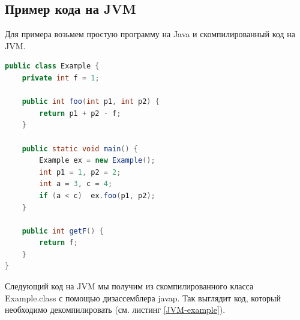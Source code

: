\subsection{Пример кода на JVM}
Для примера возьмем простую программу на Java и скомпилированный код на JVM.

\begin{lstlisting}[label=Java-example,caption=Простой Java-класс, frame = single, language = Java]
public class Example {
    private int f = 1; 

    public int foo(int p1, int p2) {
        return p1 + p2 - f;
    }

    public static void main() {
        Example ex = new Example();
        int p1 = 1, p2 = 2;
        int a = 3, c = 4;
        if (a < c)  ex.foo(p1, p2);
    }

    public int getF() {
        return f;
    }
}
\end{lstlisting}

Следующий код на JVM мы получим из скомпилированного класса Example.class с помощью дизассемблера javap. Так выглядит код, который необходимо декомпилировать (см. листинг \ref{JVM-example}).

